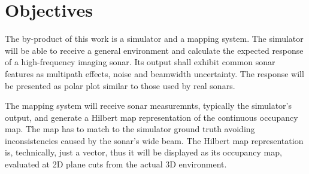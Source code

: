 

\section{Objectives}



The by-product of this work is a simulator and a mapping system. The simulator
will be able to receive a general environment and calculate the expected
response of a high-frequency imaging sonar. Its output shall exhibit common
sonar features as multipath effects, noise and beamwidth uncertainty. The
response will be presented as polar plot similar to those used by real sonars.

The mapping system will receive sonar measuremnts, typically the simulator's
output, and generate a Hilbert map representation of the continuous occupancy
map.
The map has to match to the simulator ground truth avoiding inconsistencies
caused by the sonar's wide beam. The Hilbert map representation is, technically,
just a vector, thus it will be displayed as its occupancy map, evaluated at 2D
plane cuts from the actual 3D environment.




% 
% 


